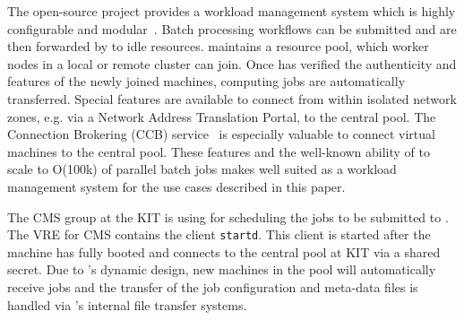 The open-source project \HTCondor provides a workload management system which is highly configurable and modular~\cite{HTCondor}. Batch processing workflows can be submitted and are then forwarded by \HTCondor to idle resources. \HTCondor maintains a resource pool, which worker nodes in a local or remote cluster can join. Once \HTCondor has verified the authenticity and features of the newly joined machines, computing jobs are automatically transferred. Special features are available to connect from within isolated network zones, e.g. via a Network Address Translation Portal, to the central \HTCondor pool. The Connection Brokering (CCB) service~\cite{HTCondorCCB} is especially valuable to connect virtual machines to the central pool. These features and the well-known ability of \HTCondor to scale to O(100k) of parallel batch jobs makes \HTCondor well suited as a workload management system for the use cases described in this paper.

The CMS group at the KIT is using \HTCondor for scheduling the jobs to be submitted to \NEMO. The VRE for CMS contains the \HTCondor client \texttt{startd}.
This client is started after the machine has fully booted and connects to the central \HTCondor pool at KIT via a shared secret. Due to \HTCondor's dynamic design, new machines in the pool will automatically receive jobs and the transfer of the job configuration and meta-data files is handled via \HTCondor's internal file transfer systems.
